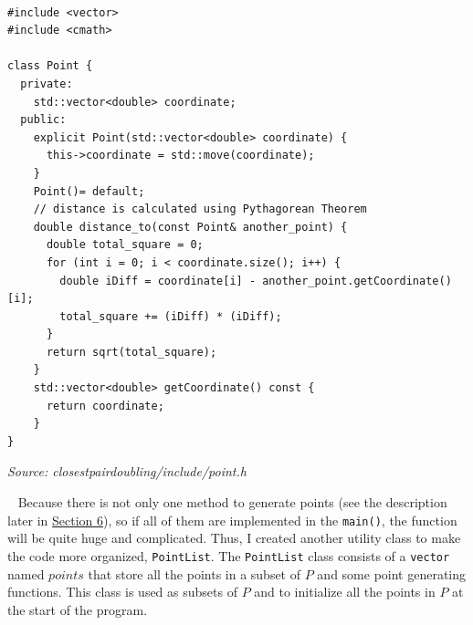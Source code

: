 \documentclass[12pt,english,]{article}
\newcommand{\code}[1]{\colorbox{light-gray}{\texttt{#1}}}
\begin{document}
~

\begin{lstlisting}
#include <vector>
#include <cmath>

class Point {
  private:
    std::vector<double> coordinate;
  public:
    explicit Point(std::vector<double> coordinate) {
      this->coordinate = std::move(coordinate);
    }
    Point()= default;
    // distance is calculated using Pythagorean Theorem
    double distance_to(const Point& another_point) {
      double total_square = 0;
      for (int i = 0; i < coordinate.size(); i++) {
        double iDiff = coordinate[i] - another_point.getCoordinate()[i];
        total_square += (iDiff) * (iDiff);
      }
      return sqrt(total_square);
    }
    std::vector<double> getCoordinate() const {
      return coordinate;
    }
}
\end{lstlisting}
\vspace{-9truemm}
\begin{minipage}{1\textwidth}
  \begin{flushright}
  {\footnotesize \emph{Source: closestpairdoubling/include/point.h}\par}
  \end{flushright}
\end{minipage}
\vspace{0.5truemm}

~ Because there is not only one method to generate points (see the
description later in \protect\hyperlink{section6}{Section 6}), so if all
of them are implemented in the \code{main()}, the function will be quite
huge and complicated. Thus, I created another utility class to make the
code more organized, \code{PointList}. The \code{PointList} class
consists of a \code{vector} named \(points\) that store all the points
in a subset of \(P\) and some point generating functions. This class is
used as subsets of \(P\) and to initialize all the points in \(P\) at
the start of the program.

~
\end{document}
